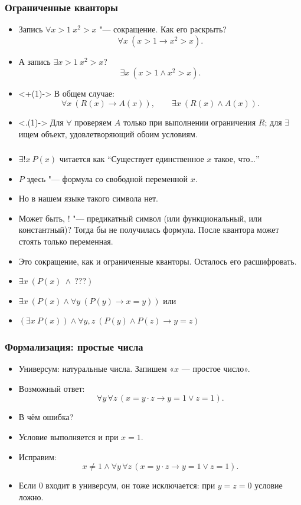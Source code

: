 \documentclass[10pt]{beamer}
\begin{document}
\begin{frame}
    \frametitle{Ограниченные кванторы}
    \begin{itemize}
        \item Запись $\forall x>1~x^2>x$ "--- сокращение. Как его раскрыть?
        \pause
        \[ \forall x~(x>1\to x^2>x). \]
        \item А запись $\exists x>1~x^2>x$?
        \pause
        \[ \exists x~(x>1\land x^2>x). \]
        \item<+(1)-> В общем случае:
        \[ \forall x~(R(x)\to A(x)),\qquad \exists x~(R(x)\land A(x)). \]
        \item<.(1)-> Для $\forall$ проверяем $A$ только при выполнении ограничения $R$; для $\exists$ ищем объект, удовлетворяющий обоим условиям.
    \end{itemize}
\end{frame}

\begin{frame}
   \frametitle{}
   \begin{itemize}
       \item $\exists ! x ~ P(x)$ читается как \pause \enquote{Существует единственное $x$ такое, что\ldots}
       \item $P$ здесь "--- формула со свободной переменной $x$. \pause
       \item Но в нашем языке такого символа нет.
       \item Может быть, $!$ "--- предикатный символ (или функциональный, или константный)? \pause Тогда бы не получилась формула. После квантора может стоять только переменная. \pause
       \item Это сокращение, как и ограниченные кванторы. Осталось его расшифровать. \pause
       \item $\exists x ~ (P(x) ~\land~ ???)$ \pause
       \item $\exists x ~ (P(x) \land \forall y ~ (P(y) \to x = y))$ или 
       \item $(\exists x ~ P(x)) \land \forall y,z ~ (P(y) \land P(z) \to y = z)$
   \end{itemize}
\end{frame}

\begin{frame}
    \frametitle{Формализация: простые числа}
    \begin{itemize}
        \item Универсум: натуральные числа. Запишем «$x$ --- простое число».
        \item Возможный ответ:
        \pause
        \[ \forall y\,\forall z\,(x=y\cdot z\to y=1\lor z=1). \]
        \item В чём ошибка?
        \pause
        \item Условие выполняется и при $x=1$.
        \pause
        \item Исправим:
        \[ x\ne1\land\forall y\,\forall z\,(x=y\cdot z\to y=1\lor z=1). \]
        \item Если $0$ входит в универсум, он тоже исключается: при $y=z=0$ условие ложно.
    \end{itemize}
\end{frame}
\end{document}
